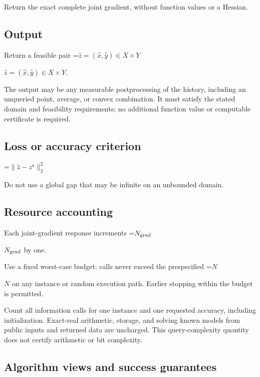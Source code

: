 \documentclass[10pt,a4paper]{article}
\newcommand{\AtlasMath}[1]{\par\begingroup\centering\setbox0=\hbox{$\displaystyle #1$}\ifdim\wd0>1.4\linewidth\typeout{ATLAS WIDE FORMULA: \the\wd0}\fi\ifdim\wd0>\linewidth\resizebox{\linewidth}{!}{\box0}\else\box0\fi\par\endgroup}
\newcommand{\AtlasInlineMath}[1]{\begingroup\setbox0=\hbox{$#1$}\ifdim\wd0>.4\linewidth\endgroup\AtlasMath{#1}\else\endgroup$#1$\fi}
\begin{document}
Return the exact complete joint gradient, without function values or a Hessian.



\subsection{Output}


Return a feasible pair \AtlasInlineMath{\widehat{z}=(\widehat{x},\widehat{y})\in X\times Y}.



The output may be any measurable postprocessing of the history, including an unqueried point, average, or convex combination. It must satisfy the stated domain and feasibility requirements; no additional function value or computable certificate is required.



\subsection{Loss or accuracy criterion}



\AtlasMath{\|\widehat{z}-z^\star\|_2^2}




Do not use a global gap that may be infinite on an unbounded domain.



\subsection{Resource accounting}


Each joint-gradient response increments \AtlasInlineMath{N_{\rm grad}} by one.



Use a fixed worst-case budget: calls never exceed the prespecified \AtlasInlineMath{N} on any instance or random execution path. Earlier stopping within the budget is permitted.



Count all information calls for one instance and one requested accuracy, including initialization. Exact-real arithmetic, storage, and solving known models from public inputs and returned data are uncharged. This query-complexity quantity does not certify arithmetic or bit complexity.



\subsection{Algorithm views and success guarantees}
\end{document}
